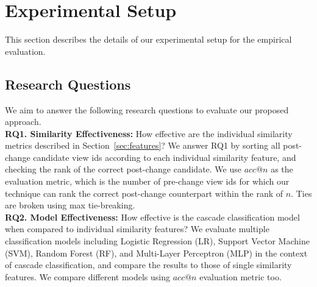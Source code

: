 \documentclass[sigconf]{acmart}
\begin{document}
\section{Experimental Setup}
\label{sec:experimental_setup}

This section describes the details of our experimental setup for the empirical
evaluation.

\subsection{Research Questions}
\label{sec:rqs}

We aim to answer the following research questions to evaluate our proposed approach.\\

\noindent\textbf{RQ1. Similarity Effectiveness:} How effective are the
individual similarity metrics described in Section~\ref{sec:features}? We
answer RQ1 by sorting all post-change candidate view ids according to each
individual similarity feature, and checking the rank of the correct
post-change candidate. We use $acc@n$ as the evaluation metric, which is the
number of pre-change view ids for which our technique can rank the correct
post-change counterpart within the rank of $n$. Ties are broken using max tie-breaking.\\

\noindent\textbf{RQ2. Model Effectiveness:} How effective is the cascade
classification model when compared to individual similarity features? We
evaluate multiple classification models including Logistic Regression (LR),
Support Vector Machine (SVM), Random Forest (RF), and Multi-Layer Perceptron
(MLP) in the context of cascade classification, and compare the results to
those of single similarity features. We compare different models using $acc@n$
evaluation metric too.
\end{document}
